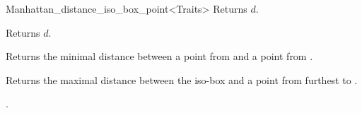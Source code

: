 \begin{ccRefClass}{Manhattan_distance_iso_box_point<Traits>}
 {Returns $d$.}

 {Returns $d$.}

{Returns the minimal distance between a point from  and a point from
.}

{Returns the maximal distance between the iso-box  and
a point from  furthest to .}


\ccSeeAlso

.




\end{ccRefClass}


